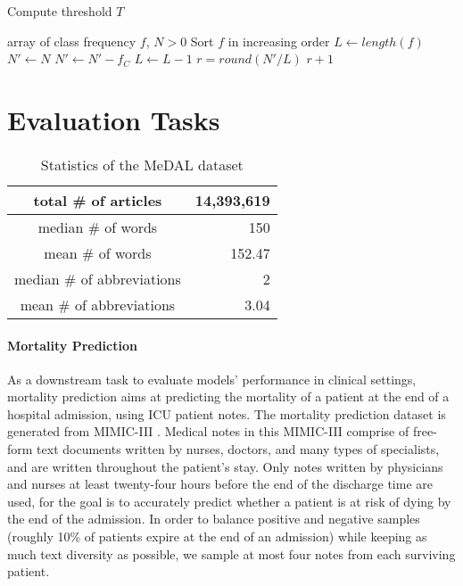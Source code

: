\documentclass[11pt,a4paper]{article}
\begin{document}
\begin{algorithm}
\caption{Compute threshold $T$}
\begin{algorithmic}
\REQUIRE array of class frequency $f$, $N>0$
\STATE Sort $f$ in increasing order
\STATE $L \leftarrow length(f)$
\STATE $N' \leftarrow N$
\STATE $N' \leftarrow N' - f_C$
\STATE $L \leftarrow L - 1$
\STATE $r = round(N' / L)$
\RETURN $r + 1$
\ENDIF
\ENDFOR
\end{algorithmic}
\label{alg:threshold}
\end{algorithm}

\section{Evaluation Tasks}\label{s:eval-task}

\begin{table}[tp]
\centering
\begin{tabular}{|c|r|}
\hline
total \# of articles & 14,393,619 \\ \hline
median \# of words & 150 \\ \hline
mean \# of words & 152.47 \\ \hline
median \# of abbreviations & 2 \\ \hline
mean \# of abbreviations & 3.04 \\ \hline
\end{tabular}
\caption{Statistics of the MeDAL dataset}
\label{tab:abb-dataset-stats}
\end{table}

\paragraph{Mortality Prediction}

As a downstream task to evaluate models' performance in clinical settings, mortality prediction aims at predicting the mortality of a patient at the end of a hospital admission, using ICU patient notes. The mortality prediction dataset is generated from MIMIC-III \citep{Johnson2016MIMIC-IIIDatabase}. Medical notes in this MIMIC-III comprise of free-form text documents written by nurses, doctors, and many types of specialists, and are written throughout the patient's stay. Only notes written by physicians and nurses at least twenty-four hours before the end of the discharge time are used, for the goal is to accurately predict whether a patient is at risk of dying by the end of the admission. In order to balance positive and negative samples (roughly 10\% of patients expire at the end of an admission) while keeping as much text diversity as possible, we sample at most four notes from each surviving patient. 
\end{document}
